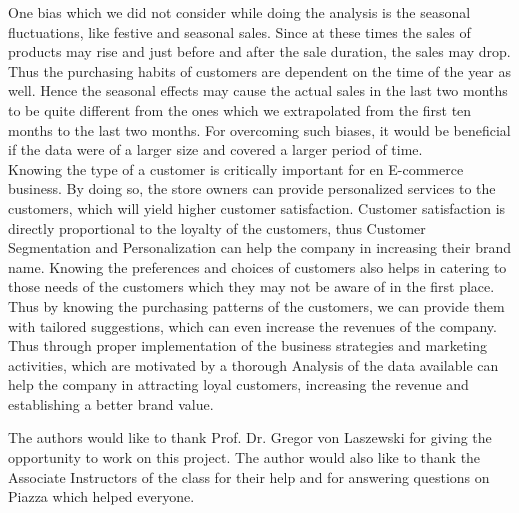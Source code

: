 One bias which we did not consider while doing the analysis is the seasonal fluctuations, like festive and seasonal sales. Since at these times the sales of products may rise and just before and after the sale duration, the sales may drop. Thus the purchasing habits of customers are dependent on the time of the year as well. Hence the seasonal effects may cause the actual sales in the last two months to be quite different from the ones which we extrapolated  from the first ten months to the last two months. For overcoming such biases, it would be beneficial if the data were of a larger size and covered a larger period of time.\\
Knowing the type of a customer is critically important for en E-commerce business. By doing so, the store owners can provide personalized services to the customers, which will yield higher customer satisfaction. Customer satisfaction is directly proportional to the loyalty of the customers, thus Customer Segmentation and Personalization can help the company in increasing their brand name. Knowing the preferences and choices of customers also helps in catering to those needs of the customers which they may not be aware of in the first place. Thus by knowing the purchasing patterns of the customers, we can provide them with tailored suggestions, which can even increase the revenues of the company. Thus through proper implementation of the business strategies and marketing activities, which are motivated by a thorough Analysis of the data available can help the company in attracting loyal customers, increasing the revenue and establishing a better brand value.  

\begin{acks}
  The authors would like to thank Prof. Dr. Gregor von Laszewski for giving the opportunity to work on this project.
  The author would also like to thank the Associate Instructors of the class for their help and for answering questions on Piazza which helped everyone.
\end{acks}




